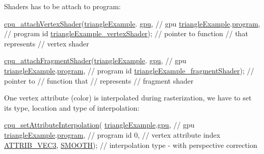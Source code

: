 Shaders has to be attach to program\-: 
\begin{DoxyCodeInclude}
  \hyperlink{program_8h_aaefc7833a6deea461cc06d00318f7975}{cpu\_attachVertexShader}(\hyperlink{triangleExample_8c_a235d77635ad30ec86f81d2caabbdc1b5}{triangleExample}.
      \hyperlink{structTriangleExampleVariables_a6c5c3f82065ae9aac07f9e6f11dd03b3}{gpu},            \textcolor{comment}{// gpu}
                         \hyperlink{triangleExample_8c_a235d77635ad30ec86f81d2caabbdc1b5}{triangleExample}.\hyperlink{structTriangleExampleVariables_aabf788228d2e91e2718facfbd911c8cc}{program},        \textcolor{comment}{// program id}
                         \hyperlink{triangleExample_8c_ae87aa91cb96803929e3d70f2ee66794c}{triangleExample\_vertexShader});  \textcolor{comment}{// pointer to function}
                                                         \textcolor{comment}{// that represents}
                                                         \textcolor{comment}{// vertex shader}

  \hyperlink{program_8h_a402ad69a9f1b80b8de408b991e190ed6}{cpu\_attachFragmentShader}(\hyperlink{triangleExample_8c_a235d77635ad30ec86f81d2caabbdc1b5}{triangleExample}.
      \hyperlink{structTriangleExampleVariables_a6c5c3f82065ae9aac07f9e6f11dd03b3}{gpu},              \textcolor{comment}{// gpu}
                           \hyperlink{triangleExample_8c_a235d77635ad30ec86f81d2caabbdc1b5}{triangleExample}.\hyperlink{structTriangleExampleVariables_aabf788228d2e91e2718facfbd911c8cc}{program},          \textcolor{comment}{// program id}
                           \hyperlink{triangleExample_8c_a098ba4902bcb365ea8faaa20be1994f4}{triangleExample\_fragmentShader});  \textcolor{comment}{// pointer to}
                                                             \textcolor{comment}{// function that}
                                                             \textcolor{comment}{// represents}
                                                             \textcolor{comment}{// fragment shader}
\end{DoxyCodeInclude}
One vertex attribute (color) is interpolated during rasterization, we have to set its type, location and type of interpolation\-: 
\begin{DoxyCodeInclude}
  \hyperlink{program_8h_aca1c5019ec58c919160c4c12a5e5fa06}{cpu\_setAttributeInterpolation}(
      \hyperlink{triangleExample_8c_a235d77635ad30ec86f81d2caabbdc1b5}{triangleExample}.\hyperlink{structTriangleExampleVariables_a6c5c3f82065ae9aac07f9e6f11dd03b3}{gpu},      \textcolor{comment}{// gpu}
      \hyperlink{triangleExample_8c_a235d77635ad30ec86f81d2caabbdc1b5}{triangleExample}.\hyperlink{structTriangleExampleVariables_aabf788228d2e91e2718facfbd911c8cc}{program},  \textcolor{comment}{// program id}
      0,                        \textcolor{comment}{// vertex attribute index}
      \hyperlink{program_8h_a349a9cde14be8097df865ba0469c0ab2af145276fddc920ef58a00542e097c47a}{ATTRIB\_VEC3}, \hyperlink{program_8h_a8472f01c511d77bbfb981a46618ea1eaa33c7ccbb848d8fd75455dd9786a1153a}{SMOOTH});  \textcolor{comment}{// interpolation type - with perspective correction}
\end{DoxyCodeInclude}

